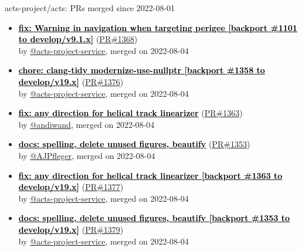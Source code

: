 \begin{frame}[allowframebreaks]{ acts-project/acts: PRs merged since 2022-08-01 }
\begin{itemize}
    \item
    \textbf{\href{https://github.com/acts-project/acts/pull/1368}{\textcolor{black}{fix: Warning in navigation when targeting perigee [backport \#1101 to develop/v9.1.x]}}}
    (\href{https://github.com/acts-project/acts/pull/1368}{PR\#1368}) \\
    by \href{https://github.com/acts-project-service}{ @acts-project-service}, merged on 2022-08-04

    \item
    \textbf{\href{https://github.com/acts-project/acts/pull/1376}{\textcolor{black}{chore: clang-tidy modernize-use-nullptr [backport \#1358 to develop/v19.x]}}}
    (\href{https://github.com/acts-project/acts/pull/1376}{PR\#1376}) \\
    by \href{https://github.com/acts-project-service}{ @acts-project-service}, merged on 2022-08-04

    \item
    \textbf{\href{https://github.com/acts-project/acts/pull/1363}{\textcolor{black}{fix: any direction for helical track linearizer}}}
    (\href{https://github.com/acts-project/acts/pull/1363}{PR\#1363}) \\
    by \href{https://github.com/andiwand}{ @andiwand}, merged on 2022-08-04

    \item
    \textbf{\href{https://github.com/acts-project/acts/pull/1353}{\textcolor{black}{docs: spelling, delete unused figures, beautify}}}
    (\href{https://github.com/acts-project/acts/pull/1353}{PR\#1353}) \\
    by \href{https://github.com/AJPfleger}{ @AJPfleger}, merged on 2022-08-04

    \item
    \textbf{\href{https://github.com/acts-project/acts/pull/1377}{\textcolor{black}{fix: any direction for helical track linearizer [backport \#1363 to develop/v19.x]}}}
    (\href{https://github.com/acts-project/acts/pull/1377}{PR\#1377}) \\
    by \href{https://github.com/acts-project-service}{ @acts-project-service}, merged on 2022-08-04

    \item
    \textbf{\href{https://github.com/acts-project/acts/pull/1379}{\textcolor{black}{docs: spelling, delete unused figures, beautify [backport \#1353 to develop/v19.x]}}}
    (\href{https://github.com/acts-project/acts/pull/1379}{PR\#1379}) \\
    by \href{https://github.com/acts-project-service}{ @acts-project-service}, merged on 2022-08-04


\end{itemize}
\end{frame}
